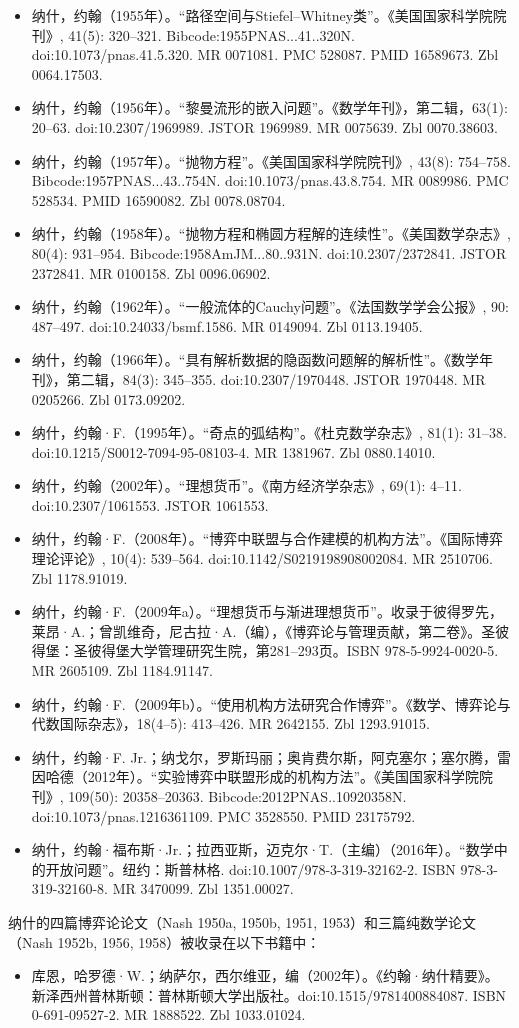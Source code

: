 \begin{itemize}
\item 纳什，约翰（1955年）。“路径空间与Stiefel–Whitney类”。《美国国家科学院院刊》, 41(5): 320–321. Bibcode:1955PNAS...41..320N. doi:10.1073/pnas.41.5.320. MR 0071081. PMC 528087. PMID 16589673. Zbl 0064.17503.
\item 纳什，约翰（1956年）。“黎曼流形的嵌入问题”。《数学年刊》，第二辑，63(1): 20–63. doi:10.2307/1969989. JSTOR 1969989. MR 0075639. Zbl 0070.38603.  
\item 纳什，约翰（1957年）。“抛物方程”。《美国国家科学院院刊》, 43(8): 754–758. Bibcode:1957PNAS...43..754N. doi:10.1073/pnas.43.8.754. MR 0089986. PMC 528534. PMID 16590082. Zbl 0078.08704.  
\item 纳什，约翰（1958年）。“抛物方程和椭圆方程解的连续性”。《美国数学杂志》, 80(4): 931–954. Bibcode:1958AmJM...80..931N. doi:10.2307/2372841. JSTOR 2372841. MR 0100158. Zbl 0096.06902.  
\item 纳什，约翰（1962年）。“一般流体的Cauchy问题”。《法国数学学会公报》, 90: 487–497. doi:10.24033/bsmf.1586. MR 0149094. Zbl 0113.19405.  
\item 纳什，约翰（1966年）。“具有解析数据的隐函数问题解的解析性”。《数学年刊》，第二辑，84(3): 345–355. doi:10.2307/1970448. JSTOR 1970448. MR 0205266. Zbl 0173.09202.  
\item 纳什，约翰·F.（1995年）。“奇点的弧结构”。《杜克数学杂志》, 81(1): 31–38. doi:10.1215/S0012-7094-95-08103-4. MR 1381967. Zbl 0880.14010.  
\item 纳什，约翰（2002年）。“理想货币”。《南方经济学杂志》, 69(1): 4–11. doi:10.2307/1061553. JSTOR 1061553.  
\item 纳什，约翰·F.（2008年）。“博弈中联盟与合作建模的机构方法”。《国际博弈理论评论》, 10(4): 539–564. doi:10.1142/S0219198908002084. MR 2510706. Zbl 1178.91019.
\item 纳什，约翰·F.（2009年a）。“理想货币与渐进理想货币”。收录于彼得罗先，莱昂·A.；曾凯维奇，尼古拉·A.（编），《博弈论与管理贡献，第二卷》。圣彼得堡：圣彼得堡大学管理研究生院，第281–293页。ISBN 978-5-9924-0020-5. MR 2605109. Zbl 1184.91147.  
\item 纳什，约翰·F.（2009年b）。“使用机构方法研究合作博弈”。《数学、博弈论与代数国际杂志》，18(4–5): 413–426. MR 2642155. Zbl 1293.91015.  
\item 纳什，约翰·F. Jr.；纳戈尔，罗斯玛丽；奥肯费尔斯，阿克塞尔；塞尔腾，雷因哈德（2012年）。“实验博弈中联盟形成的机构方法”。《美国国家科学院院刊》, 109(50): 20358–20363. Bibcode:2012PNAS..10920358N. doi:10.1073/pnas.1216361109. PMC 3528550. PMID 23175792.  
\item 纳什，约翰·福布斯·Jr.；拉西亚斯，迈克尔·T.（主编）（2016年）。“数学中的开放问题”。纽约：斯普林格. doi:10.1007/978-3-319-32162-2. ISBN 978-3-319-32160-8. MR 3470099. Zbl 1351.00027.
\end{itemize}
纳什的四篇博弈论论文（Nash 1950a, 1950b, 1951, 1953）和三篇纯数学论文（Nash 1952b, 1956, 1958）被收录在以下书籍中：
\begin{itemize}
\item 库恩，哈罗德·W.；纳萨尔，西尔维亚，编（2002年）。《约翰·纳什精要》。新泽西州普林斯顿：普林斯顿大学出版社。doi:10.1515/9781400884087. ISBN 0-691-09527-2. MR 1888522. Zbl 1033.01024.
\end{itemize}
